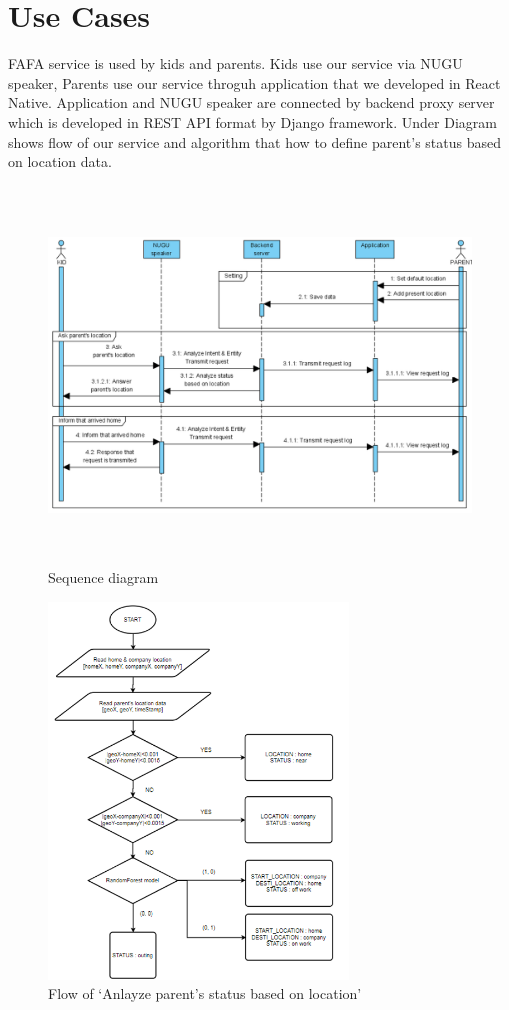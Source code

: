 \documentclass[conference]{IEEEtran}
\begin{document}
\section{Use Cases}
FAFA service is used by kids and parents. Kids use our service via NUGU speaker, Parents use our service throguh application that we developed in React Native. Application and NUGU speaker are connected by backend proxy server which is developed in REST API format by Django framework. Under Diagram shows flow of our service and algorithm that how to define parent’s status based on location data.\\

\begin{figure}[htbp]
        \centering
        \hfill
        \includegraphics[width=\textwidth, height=10cm]{images/figure7.png}
        \hfill
        \caption{Sequence diagram}
\end{figure}
    
\begin{figure}[htbp]
        \centering
        \hfill
        \includegraphics[height=10cm]{images/figure8.png}
        \hfill
        \caption{Flow of ‘Anlayze parent’s status based on location’}
\end{figure}
\end{document}
